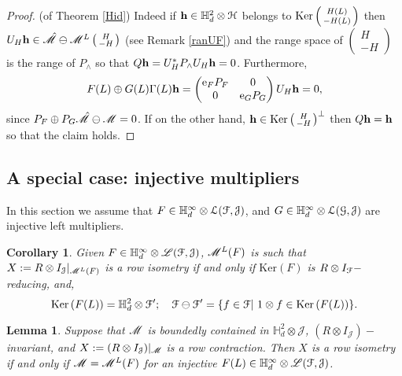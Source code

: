 \documentclass[11pt]{article}
\newcommand{\bpm}{\begin{pmatrix}}
\newcommand{\epm}{\end{pmatrix}}
\newcommand{\bsm}{\left ( \begin{smallmatrix}}
\newcommand{\esm}{\end{smallmatrix} \right) }
\newcommand{\mr}{\ensuremath{\mathrm}}
\newcommand{\scr}{\ensuremath{\mathscr}}
\newcommand{\mbf}{\ensuremath{\mathbf}}
\newcommand{\mc}{\ensuremath{\mathcal}}
\newcommand{\Ga}{\ensuremath{\Gamma}}
\def\bH{\mathbb{H}}
\newcommand{\J}{\ensuremath{\mathcal{J} }}
\renewcommand{\L}{\ensuremath{\mathscr{L} }}
\renewcommand{\ker}[1]{\ensuremath{\mathrm{Ker} \left( {#1} \right) }}
\numberwithin{equation}{section}
\numberwithin{subsection}{section}
\newtheorem{lemma}[subsection]{Lemma}
\newtheorem{cor}[subsection]{Corollary}
\theoremstyle{definition}
\begin{document}
\begin{proof}{(of Theorem \ref{Hid})}
Indeed if $\mbf{h} \in \bH ^2 _d \otimes \mc{H}$ belongs to $\mr{Ker} \bsm H(L) \\ - H(L) \esm $ then $U_H \mbf{h} \in \hat{\scr{M}} \ominus \scr{M} ^L \bsm H \\ - H \esm$ (see Remark \ref{ranUF}) and the range space of $\bsm H \\ -H \esm$ is the range of $P_\wedge$ so that $Q \mbf{h} = U_H ^* P _\wedge U_H \mbf{h} = 0$. Furthermore,
$$ F(L) \oplus G(L) \Ga (L) \mbf{h} = \bpm \mr{e} _F P_F & 0 \\ 0 & \mr{e} _G P_G \epm U_H \mbf{h} =0, $$ since $P_F \oplus P_G \hat{\scr{M}} \ominus \scr{M} =0$. If on the other hand, $\mbf{h} \in \mr{Ker} \bsm H \\ - H \esm ^\perp$ then $Q \mbf{h} = \mbf{h}$ so that the claim holds. 
\end{proof}


\subsection*{A special case: injective multipliers}

In this section we assume that $F \in \bH ^\infty _d \otimes \mc{L} ( \mc{F} , \J )$, and $G \in \bH ^\infty _d \otimes \mc{L} (\mc{G}, \J )$ are injective left multipliers.


\begin{cor} \label{isom}
Given $F \in \bH ^\infty _d \otimes \L ( \mc{F} , \J )$, $\scr{M} ^L (F) $ is such that $X := R \otimes I_\J | _{\scr{M} ^L (F)}$ is a row isometry if and only if $\ker{F}$ is $R \otimes I_\mc{F}-$reducing, and,
$$ \ker{F(L)} = \bH ^2 _d \otimes \mc{F} '; \quad \mc{F} \ominus \mc{F} ' = \{ f \in \mc{F} | \  1 \otimes f \in \ker{F(L)} \}. $$
\end{cor}

\begin{lemma} \label{isolemma} Suppose that $\scr{M}$ is boundedly contained in $\bH ^2 _d \otimes \J$, $(R \otimes I_\J)-$invariant, and $X := (R \otimes I_\J )| _{\scr{M}}$ is a row contraction. Then $X$ is a row isometry if and only if $\scr{M} = \scr{M} ^L (F)$ for an injective $F(L) \in \bH ^\infty _d \otimes \L (\mc{F} , \J ) $.
\end{lemma}
\end{document}
